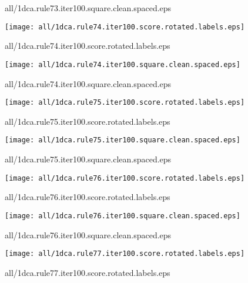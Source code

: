 \documentclass{article}
\begin{document}
{\footnotesize all/1dca.rule73.iter100.square.clean.spaced.eps}
\begin{center}
\begin{minipage}{\textwidth}
\texttt{[image: all/1dca.rule74.iter100.score.rotated.labels.eps]}
\end{minipage}
\end{center}
{\footnotesize all/1dca.rule74.iter100.score.rotated.labels.eps}
\begin{center}
\begin{minipage}{\textwidth}
\texttt{[image: all/1dca.rule74.iter100.square.clean.spaced.eps]}
\end{minipage}
\end{center}
{\footnotesize all/1dca.rule74.iter100.square.clean.spaced.eps}
\begin{center}
\begin{minipage}{\textwidth}
\texttt{[image: all/1dca.rule75.iter100.score.rotated.labels.eps]}
\end{minipage}
\end{center}
{\footnotesize all/1dca.rule75.iter100.score.rotated.labels.eps}
\begin{center}
\begin{minipage}{\textwidth}
\texttt{[image: all/1dca.rule75.iter100.square.clean.spaced.eps]}
\end{minipage}
\end{center}
{\footnotesize all/1dca.rule75.iter100.square.clean.spaced.eps}
\begin{center}
\begin{minipage}{\textwidth}
\texttt{[image: all/1dca.rule76.iter100.score.rotated.labels.eps]}
\end{minipage}
\end{center}
{\footnotesize all/1dca.rule76.iter100.score.rotated.labels.eps}
\begin{center}
\begin{minipage}{\textwidth}
\texttt{[image: all/1dca.rule76.iter100.square.clean.spaced.eps]}
\end{minipage}
\end{center}
{\footnotesize all/1dca.rule76.iter100.square.clean.spaced.eps}
\begin{center}
\begin{minipage}{\textwidth}
\texttt{[image: all/1dca.rule77.iter100.score.rotated.labels.eps]}
\end{minipage}
\end{center}
{\footnotesize all/1dca.rule77.iter100.score.rotated.labels.eps}
\end{document}
